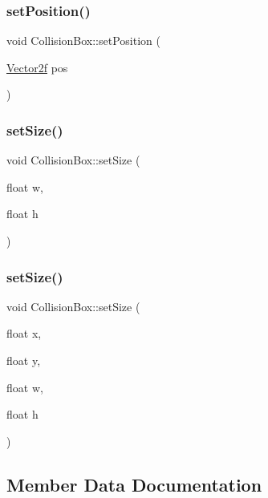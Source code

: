 \subsubsection{\texorpdfstring{setPosition()}{setPosition()}\hspace{0.1cm}{\footnotesize\ttfamily [2/2]}}
{\footnotesize\ttfamily void Collision\+Box\+::set\+Position (\begin{DoxyParamCaption}\item[{\mbox{\hyperlink{class_vector2f}{Vector2f}}}]{pos }\end{DoxyParamCaption})}

\mbox{\label{class_collision_box_a548872339aca0b62d4f515ac7378e864}} 
\subsubsection{\texorpdfstring{setSize()}{setSize()}\hspace{0.1cm}{\footnotesize\ttfamily [1/2]}}
{\footnotesize\ttfamily void Collision\+Box\+::set\+Size (\begin{DoxyParamCaption}\item[{float}]{w,  }\item[{float}]{h }\end{DoxyParamCaption})}

\mbox{\label{class_collision_box_a5f75f1544e0f08e1c218a1616150d1c8}} 
\subsubsection{\texorpdfstring{setSize()}{setSize()}\hspace{0.1cm}{\footnotesize\ttfamily [2/2]}}
{\footnotesize\ttfamily void Collision\+Box\+::set\+Size (\begin{DoxyParamCaption}\item[{float}]{x,  }\item[{float}]{y,  }\item[{float}]{w,  }\item[{float}]{h }\end{DoxyParamCaption})}



\subsection{Member Data Documentation}
\mbox{\label{class_collision_box_ab46fbe0c72f6c67074798ec6c926bd6a}} 
